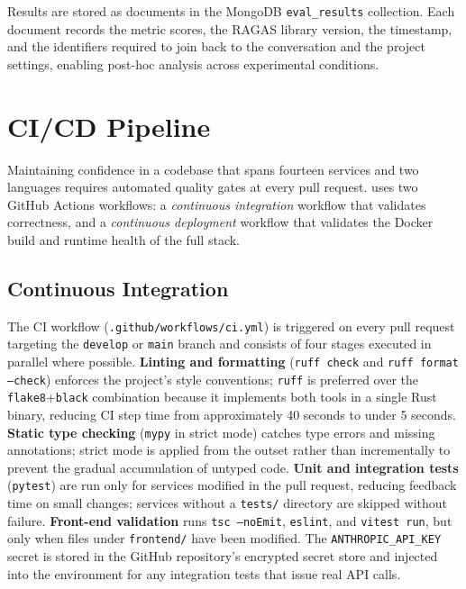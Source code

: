 Results are stored as documents in the MongoDB \texttt{eval\_results}
collection.  Each document records the metric scores, the RAGAS library
version, the timestamp, and the identifiers required to join back to the
conversation and the project settings, enabling post-hoc analysis across
experimental conditions.

\section{CI/CD Pipeline}
\label{sec:cicd}

Maintaining confidence in a codebase that spans fourteen services and two
languages requires automated quality gates at every pull request.  \medrag{}
uses two GitHub Actions workflows: a \emph{continuous integration} workflow
that validates correctness, and a \emph{continuous deployment} workflow that
validates the Docker build and runtime health of the full stack.

\subsection{Continuous Integration}

The CI workflow (\texttt{.github/workflows/ci.yml}) is triggered on every
pull request targeting the \texttt{develop} or \texttt{main} branch and consists of
four stages executed in parallel where possible.
\textbf{Linting and formatting} (\texttt{ruff check} and \texttt{ruff format --check})
enforces the project's style conventions; \texttt{ruff} is preferred over the
\texttt{flake8}+\texttt{black} combination because it implements both tools in a single
Rust binary, reducing CI step time from approximately 40 seconds to under 5 seconds.
\textbf{Static type checking} (\texttt{mypy} in strict mode) catches type errors and
missing annotations; strict mode is applied from the outset rather than incrementally
to prevent the gradual accumulation of untyped code.
\textbf{Unit and integration tests} (\texttt{pytest}) are run only for services modified
in the pull request, reducing feedback time on small changes; services without a
\texttt{tests/} directory are skipped without failure.
\textbf{Front-end validation} runs \texttt{tsc --noEmit}, \texttt{eslint}, and
\texttt{vitest run}, but only when files under \texttt{frontend/} have been modified.
The \texttt{ANTHROPIC\_API\_KEY} secret is stored in the GitHub repository's encrypted
secret store and injected into the environment for any integration tests that issue real
API calls.


